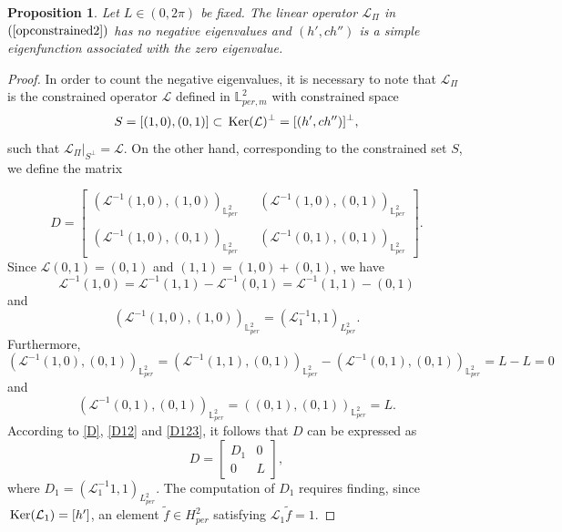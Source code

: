 \documentclass[12pt,reqno,a4paper]{amsart} %
\newtheorem{prop}{Proposition}[section]
\newcommand{\Ker}{{\rm \,Ker}}
\numberwithin{equation}{section}
\numberwithin{figure}{section}
\begin{document}
\begin{prop}\label{leman1}
 Let $L\in (0,2\pi)$ be fixed. The linear operator $\mathcal{L}_{\Pi}$ in $(\ref{opconstrained2})$ has no negative eigenvalues and $(h',ch'')$ is a simple eigenfunction associated with the zero eigenvalue. 
\end{prop}
\begin{proof}
	
	
In order to count the negative eigenvalues, it is necessary to note that $\mathcal{L}_{\Pi}$ is the constrained operator $\mathcal{L}$ defined in $\mathbb{L}_{per,m}^2$ with constrained space $$S= [(1,0),(0,1)] \subset \Ker(\mathcal{L})^{\perp}=[(h',ch'')]^\perp,$$ 
such that $\mathcal{L}_{\Pi}\big |_{S^\perp}=\mathcal{L}$. On the other hand, corresponding to the constrained set $S$, we define the matrix
 
 \begin{equation}\label{matrixD}
 	D=\left[\begin{array}{llll}(\mathcal{L}^{-1}(1,0),(1,0))_{\mathbb{L}^2_{per}}& & (\mathcal{L}^{-1}(1,0),(0,1))_{\mathbb{L}^2_{per}}\\\\
 		(\mathcal{L}^{-1}(1,0),(0,1))_{\mathbb{L}^2_{per}}& & (\mathcal{L}^{-1}(0,1),(0,1))_{\mathbb{L}^2_{per}}\end{array}\right].
 	\end{equation}
Since $\mathcal{L}(0,1)=(0,1)$ and $(1,1)=(1,0)+(0,1)$, we have $$\mathcal{L}^{-1}(1,0)=\mathcal{L}^{-1}(1,1)-\mathcal{L}^{-1}(0,1)=\mathcal{L}^{-1}(1,1)-(0,1)$$ and
 \begin{equation}\label{D}
\left( \mathcal{L}^{-1}(1,0), (1,0) \right)_{\mathbb{L}^2_{per}}%
= ( \mathcal{L}_1^{-1} 1,1)_{L^2_{per}}.%
\end{equation}
Furthermore,
\begin{equation}\label{D12}
		\left( \mathcal{L}^{-1}(1,0), (0,1) \right)_{\mathbb{L}^2_{per}}=\left(\mathcal{L}^{-1}(1,1),(0,1)\right)_{\mathbb{L}^2_{per}}-\left(\mathcal{L}^{-1}(0,1),(0,1)
		\right)_{\mathbb{L}^2_{per}}=L-L=0\end{equation}
and 
\begin{equation}\label{D123}
	\left( \mathcal{L}^{-1}(0,1), (0,1) \right)_{\mathbb{L}^2_{per}}=\left((0,1),(0,1)\right)_{\mathbb{L}^2_{per}}=L.\end{equation}
According to \eqref{D}, \eqref{D12} and \eqref{D123}, it follows that $D$ can be expressed as $$D=\left[\begin{array}{cc}D_1&  0\\
	0&  L\end{array}\right],$$ where $D_1=(\mathcal{L}_{1}^{-1}1,1)_{L_{per}^2}$. The computation of $D_1$ requires finding, since $\Ker(\mathcal{L}_1)=[h']$, an element $\tilde{f}\in H_{per}^2$ satisfying $\mathcal{L}_1\tilde{f}=1$. 
	

\end{proof}
\end{document}
